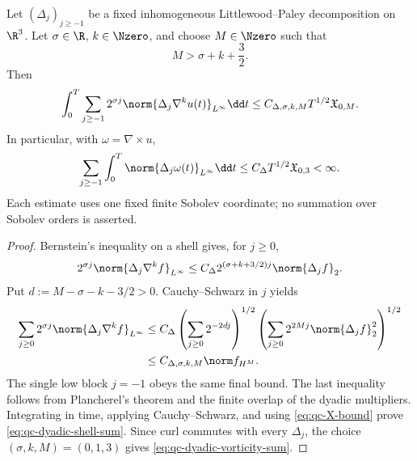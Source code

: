 \begin{proposition}
\label{prop:qc-dyadic-shell-sums}
Let \((\Delta_j)_{j\ge-1}\) be a fixed inhomogeneous
Littlewood--Paley decomposition on \(\R^3\).  Let
\(\sigma\in\R\), \(k\in\Nzero\), and choose \(M\in\Nzero\) such that
\begin{equation}
 M>\sigma+k+\frac32.
 \label{eq:qc-dyadic-order-condition}
\end{equation}
Then
\begin{equation}
 \int_0^T\sum_{j\ge-1}2^{\sigma j}
 \norm{\Delta_j\nabla^ku(t)}_{L^\infty}\dd t
 \le C_{\Delta,\sigma,k,M}T^{1/2}\mathfrak X_{0,M}.
 \label{eq:qc-dyadic-shell-sum}
\end{equation}
In particular, with \(\omega=\nabla\times u\),
\begin{equation}
 \sum_{j\ge-1}\int_0^T
 \norm{\Delta_j\omega(t)}_{L^\infty}\dd t
 \le C_\Delta T^{1/2}\mathfrak X_{0,3}<\infty.
 \label{eq:qc-dyadic-vorticity-sum}
\end{equation}
Each estimate uses one fixed finite Sobolev coordinate; no summation over
Sobolev orders is asserted.
\end{proposition}

\begin{proof}
Bernstein's inequality on a shell gives, for \(j\ge0\),
\[
 2^{\sigma j}\norm{\Delta_j\nabla^kf}_{L^\infty}
 \le C_\Delta 2^{(\sigma+k+3/2)j}\norm{\Delta_jf}_2.
\]
Put \(d:=M-\sigma-k-3/2>0\).  Cauchy--Schwarz in \(j\) yields
\begin{align*}
 \sum_{j\ge0}2^{\sigma j}
 \norm{\Delta_j\nabla^kf}_{L^\infty}
 &\le C_\Delta
 \left(\sum_{j\ge0}2^{-2dj}\right)^{1/2}
 \left(\sum_{j\ge0}2^{2Mj}\norm{\Delta_jf}_2^2\right)^{1/2}\\
 &\le C_{\Delta,\sigma,k,M}\norm f_{H^M}.
\end{align*}
The single low block \(j=-1\) obeys the same final bound.  The last
inequality follows from Plancherel's theorem and the finite overlap of the
dyadic multipliers.  Integrating in time, applying Cauchy--Schwarz, and using
\eqref{eq:qc-X-bound} prove \eqref{eq:qc-dyadic-shell-sum}.  Since curl
commutes with every \(\Delta_j\), the choice
\((\sigma,k,M)=(0,1,3)\) gives
\eqref{eq:qc-dyadic-vorticity-sum}.
\end{proof}

